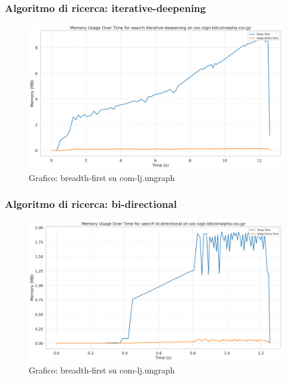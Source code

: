 \documentclass{article}
\begin{document}
\subsubsection{Algoritmo di ricerca: iterative-deepening}
\begin{figure}[h]\centering
\includegraphics[width=\textwidth]{../plots/soc-sign-bitcoinalpha.csv_iterative-deepening.png}
\caption{Grafico: breadth-first su com-lj.ungraph}
\end{figure}
\subsubsection{Algoritmo di ricerca: bi-directional}
\begin{figure}[h]\centering
\includegraphics[width=\textwidth]{../plots/soc-sign-bitcoinalpha.csv_bi-directional.png}
\caption{Grafico: breadth-first su com-lj.ungraph}
\end{figure}
\end{document}
